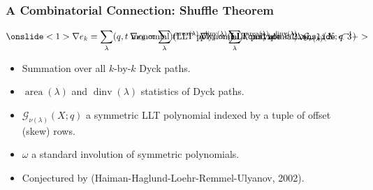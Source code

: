 \documentclass[dvipsnames]{beamer}
\newcommand{\Gcal}{{\mathcal G}}
\DeclareMathOperator{\dinv}{dinv}
\DeclareMathOperator{\area}{area}
\theoremstyle{definition}
\newcounter{c}
\begin{document}
\begin{frame}
  \frametitle{A Combinatorial Connection: Shuffle Theorem}
  \begin{theorem}
    \[
       \onslide<1>{\nabla e_k = \sum_\lambda (q,t\text{ monomial})(\text{LLT polynomial})}
      \onslide<2>{\hspace{-20em}\nabla e_k = \sum_\lambda
        t^{\area(\lambda)}q^{\dinv(\lambda)}(\text{LLT polynomial})}
      \onslide<3->{\hspace{-19em}\nabla e_k = \sum_\lambda t^{\area(\lambda)}q^{\dinv(\lambda)}
        \omega \Gcal_{\nu(\lambda)}(X;q^{-1})}
    \]
  \end{theorem}
  \begin{itemize}
  \item Summation over all \(k\)-by-\(k\) Dyck paths.\pause
  \item \(\area(\lambda)\) and \(\dinv(\lambda)\) statistics of Dyck paths.\pause
  \item \(\Gcal_{\nu(\lambda)}(X;q)\) a symmetric LLT polynomial
    indexed by a tuple of offset (skew) rows. \pause
  \item \(\omega\) a standard involution of symmetric polynomials. \pause
  \item Conjectured by (Haiman-Haglund-Loehr-Remmel-Ulyanov, 2002).
  \end{itemize}
\end{frame}
\end{document}
